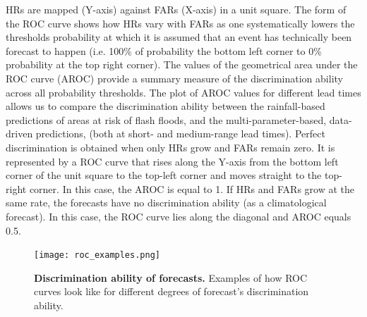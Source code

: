 HRs are mapped (Y-axis) against FARs (X-axis) in a unit square. The form of the ROC curve shows how HRs vary with FARs as one systematically lowers the thresholds probability at which it is assumed that an event has technically been forecast to happen (i.e. 100\% of probability the bottom left corner to 0\% probability at the top right corner). The values of the geometrical area under the ROC curve (AROC) provide a summary measure of the discrimination ability across all probability thresholds. The plot of AROC values for different lead times allows us to compare the discrimination ability between the rainfall-based predictions of areas at risk of flash floods, and the multi-parameter-based, data-driven predictions, (both at short- and medium-range lead times). Perfect discrimination is obtained when only HRs grow and FARs remain zero. It is represented by a ROC curve that rises along the Y-axis from the bottom left corner of the unit square to the top-left corner and moves straight to the top-right corner. In this case, the AROC is equal to 1. If HRs and FARs grow at the same rate, the forecasts have no discrimination ability (as a climatological forecast). In this case, the ROC curve lies along the diagonal and AROC equals 0.5. 

\begin{figure}[htbp]
\centering
\texttt{[image: roc\_examples.png]}
\caption{\textbf{Discrimination ability of forecasts.} Examples of how ROC curves look like for different degrees of forecast's discrimination ability.}
\label{fig:roc_examples}
\end{figure}

